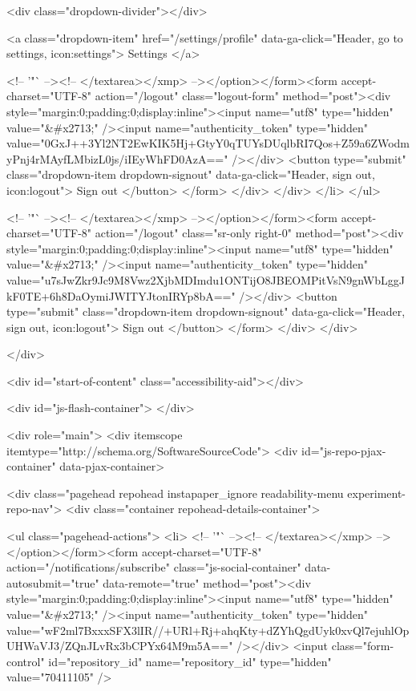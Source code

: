         <div class="dropdown-divider"></div>

        <a class="dropdown-item" href="/settings/profile" data-ga-click="Header, go to settings, icon:settings">
          Settings
        </a>

        <!-- '"` --><!-- </textarea></xmp> --></option></form><form accept-charset="UTF-8" action="/logout" class="logout-form" method="post"><div style="margin:0;padding:0;display:inline"><input name="utf8" type="hidden" value="&#x2713;" /><input name="authenticity_token" type="hidden" value="0GxJ++3Yl2NT2EwKIK5Hj+GtyY0qTUYsDUqlbRI7Qos+Z59a6ZWodmyPnj4rMAyfLMbizL0js/iIEyWhFD0AzA==" /></div>
          <button type="submit" class="dropdown-item dropdown-signout" data-ga-click="Header, sign out, icon:logout">
            Sign out
          </button>
</form>      </div>
    </div>
  </li>
</ul>


    <!-- '"` --><!-- </textarea></xmp> --></option></form><form accept-charset="UTF-8" action="/logout" class="sr-only right-0" method="post"><div style="margin:0;padding:0;display:inline"><input name="utf8" type="hidden" value="&#x2713;" /><input name="authenticity_token" type="hidden" value="u7sJwZkr9Jc9M8Vwz2XjbMDImdu1ONTijO8JBEOMPitVsN9gnWbLggJkF0TE+6h8DaOymiJWITYJtonIRYp8bA==" /></div>
      <button type="submit" class="dropdown-item dropdown-signout" data-ga-click="Header, sign out, icon:logout">
        Sign out
      </button>
</form>  </div>
</div>


      

  </div>

  <div id="start-of-content" class="accessibility-aid"></div>

    <div id="js-flash-container">
</div>



  <div role="main">
        <div itemscope itemtype="http://schema.org/SoftwareSourceCode">
    <div id="js-repo-pjax-container" data-pjax-container>
        


  <div class="pagehead repohead instapaper_ignore readability-menu experiment-repo-nav">
    <div class="container repohead-details-container">


      <ul class="pagehead-actions">
  <li>
        <!-- '"` --><!-- </textarea></xmp> --></option></form><form accept-charset="UTF-8" action="/notifications/subscribe" class="js-social-container" data-autosubmit="true" data-remote="true" method="post"><div style="margin:0;padding:0;display:inline"><input name="utf8" type="hidden" value="&#x2713;" /><input name="authenticity_token" type="hidden" value="wF2ml7BxxxSFX3lIR//+URl+Rj+ahqKty+dZYhQgdUyk0xvQl7ejuhlOpUHWaVJ3/ZQnJLvRx3bCPYx64M9m5A==" /></div>      <input class="form-control" id="repository_id" name="repository_id" type="hidden" value="70411105" />

